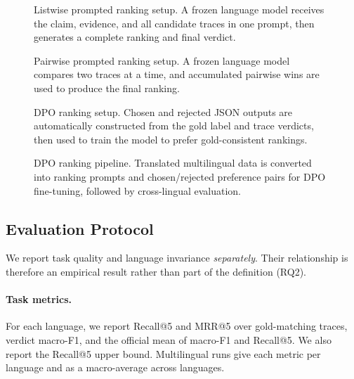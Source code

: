 \begin{figure}[htbp]
  \centering
  
\caption{Listwise prompted ranking setup. A frozen language model receives the claim, evidence, and all candidate traces in one prompt, then generates a complete ranking and final verdict.}
\label{fig:listwise-prompted-ranking}
\end{figure}

\begin{figure}[htbp]
  \centering
  
\caption{Pairwise prompted ranking setup. A frozen language model compares two traces at a time, and accumulated pairwise wins are used to produce the final ranking.}
\label{fig:pairwise-prompted-ranking}
\end{figure}

\begin{figure}[htbp]
  \centering
  
\caption{DPO ranking setup. Chosen and rejected JSON outputs are automatically constructed from the gold label and trace verdicts, then used to train the model to prefer gold-consistent rankings.}
\label{fig:dpo-ranking}
\end{figure}

\begin{figure}[htbp]
  \centering
  
\caption{DPO ranking pipeline. Translated multilingual data is converted into ranking prompts and chosen/rejected preference pairs for DPO fine-tuning, followed by cross-lingual evaluation.}
\label{fig:dpo-pipeline}
\end{figure}

\subsection{Evaluation Protocol}
\label{subsec:method-eval}

We report task quality and language invariance \emph{separately}. Their relationship is therefore an
empirical result rather than part of the definition
\cite{elazar2021measuringimprovingconsistencypretrained,Qi_2023} (RQ2).

\paragraph{Task metrics.}
For each language, we report Recall@5 and MRR@5 over gold-matching traces, verdict macro-F1, and the
official mean of macro-F1 and Recall@5. We also report the Recall@5 upper bound. Multilingual runs
give each metric per language and as a macro-average across languages.

